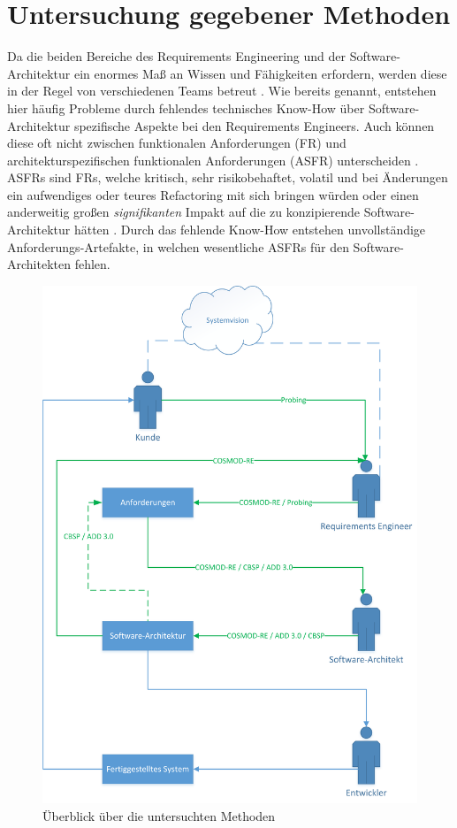 \section{Untersuchung gegebener Methoden}\label{unters}
Da die beiden Bereiche des Requirements Engineering und der Software-Architektur ein enormes Ma\ss{} an Wissen und F\"ahigkeiten erfordern, werden diese in der Regel von verschiedenen Teams betreut \cite{Ros02}. Wie bereits genannt, entstehen hier h\"aufig Probleme durch fehlendes technisches Know-How \"uber Software-Architektur spezifische Aspekte bei den Requirements Engineers. Auch k\"onnen diese oft nicht zwischen funktionalen Anforderungen (FR) und architekturspezifischen funktionalen Anforderungen (ASFR) unterscheiden \cite{Ros03}. ASFRs sind FRs, welche kritisch, sehr risikobehaftet, volatil und bei \"Anderungen ein aufwendiges oder teures Refactoring mit sich bringen w\"urden oder einen anderweitig gro\ss{}en \textit{signifikanten} Impakt auf die zu konzipierende Software-Architektur h\"atten \cite{Ros02}. Durch das fehlende Know-How entstehen unvollst\"andige Anforderungs-Artefakte, in welchen wesentliche ASFRs f\"ur den Software-Architekten fehlen. \\

\begin{figure}[h]
	\centering
	\includegraphics[scale=0.5]{methoden.png} 
	\caption{\"Uberblick \"uber die untersuchten Methoden}\label{methoden}
\end{figure}

